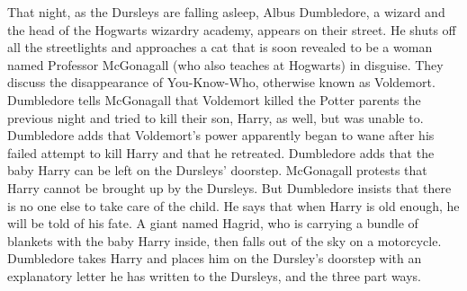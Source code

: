 That night, as the Dursleys are falling asleep, Albus Dumbledore, a wizard and the head of the Hogwarts wizardry academy, appears on their street. He shuts off all the streetlights and approaches a cat that is soon revealed to be a woman named Professor McGonagall (who also teaches at Hogwarts) in disguise. They discuss the disappearance of You-Know-Who, otherwise known as Voldemort. Dumbledore tells McGonagall that Voldemort killed the Potter parents the previous night and tried to kill their son, Harry, as well, but was unable to. Dumbledore adds that Voldemort’s power apparently began to wane after his failed attempt to kill Harry and that he retreated. Dumbledore adds that the baby Harry can be left on the Dursleys’ doorstep. McGonagall protests that Harry cannot be brought up by the Dursleys. But Dumbledore insists that there is no one else to take care of the child. He says that when Harry is old enough, he will be told of his fate. A giant named Hagrid, who is carrying a bundle of blankets with the baby Harry inside, then falls out of the sky on a motorcycle. Dumbledore takes Harry and places him on the Dursley’s doorstep with an explanatory letter he has written to the Dursleys, and the three part ways.

\newpage
